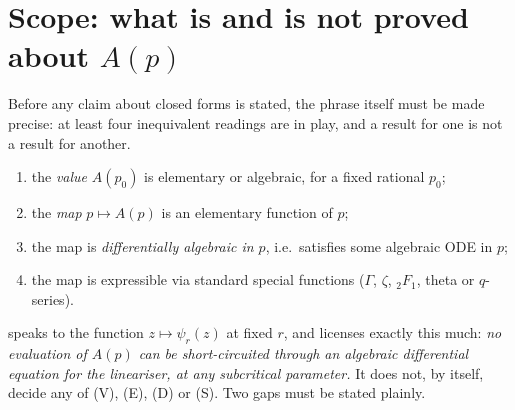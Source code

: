 \section{Scope: what is and is not proved about $A(p)$}
\label{a:sec:scope}
Before any claim about closed forms is stated, the phrase itself must be made precise: at least four inequivalent readings are in play, and a result for one is not a result for another.
\begin{enumerate}[label=\textup{(\Alph*)},leftmargin=*]
\item[\textbf{(V)}] the \emph{value} $A(p_0)$ is elementary or algebraic, for a fixed rational $p_0$;
\item[\textbf{(E)}] the \emph{map} $p\mapsto A(p)$ is an elementary function of $p$;
\item[\textbf{(D)}] the map is \emph{differentially algebraic in $p$}, i.e.\ satisfies some algebraic ODE in $p$;
\item[\textbf{(S)}] the map is expressible via standard special functions ($\Gamma$, $\zeta$, ${}_2F_1$, theta or $q$-series).
\end{enumerate}
 speaks to the function $z\mapsto\psi_r(z)$ at fixed $r$, and licenses exactly this much: \emph{no evaluation of $A(p)$ can be short-circuited through an algebraic differential equation for the lineariser, at any subcritical parameter.} It does not, by itself, decide any of (V), (E), (D) or (S). Two gaps must be stated plainly.

